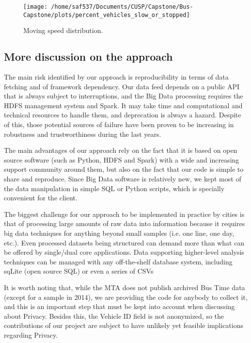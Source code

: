 \documentclass[12pt]{report}
\begin{document}
\begin{itemize}
\begin{figure}[!ht]
  \caption{Moving speed distribution.}
  \label{adh}
  \centering
    \texttt{[image: /home/saf537/Documents/CUSP/Capstone/Bus-Capstone/plots/percent\_vehicles\_slow\_or\_stopped]}
\end{figure}




\end{itemize}


\subsection{More discussion on the approach}

The main risk identified by our approach is reproducibility in terms of data fetching and of framework dependency. Our data feed depends on a public API that is always subject to interruptions, and the Big Data processing requires the HDFS management system and Spark. It may take time and computational and technical resources to handle them, and deprecation is always a hazard. Despite of this, those potential sources of failure have been proven to be increasing in robustness and trustworthiness during the last years.

The main advantages of our approach rely on the fact that it is based on open source software (such as Python, HDFS and Spark) with a wide and increasing support community around them, but also on the fact that our code is simple to share and reproduce. Since Big Data software is relatively new, we kept most of the data manipulation in simple SQL or Python scripts, which is specially convenient for the client.

The biggest challenge for our approach to be implemented in practice by cities is that of processing large amounts of raw data into information because it requires big data techniques for anything beyond small samples (i.e. one line, one day, etc.). Even processed datasets being structured can demand more than what can be offered by single/dual core applications. Data supporting higher-level analysis techniques can be managed with any off-the-shelf database system, including sqLite (open source SQL) or even a series of CSVs

It is worth noting that, while the MTA does not publish archived Bus Time data (except for a sample in 2014), we are providing the code for anybody to collect it, and this is an important step that must be kept into account when discussing about Privacy.  Besides this, the Vehicle ID field is not anonymized, so the contributions of our project are subject to have unlikely yet feasible implications regarding Privacy.
\end{document}
